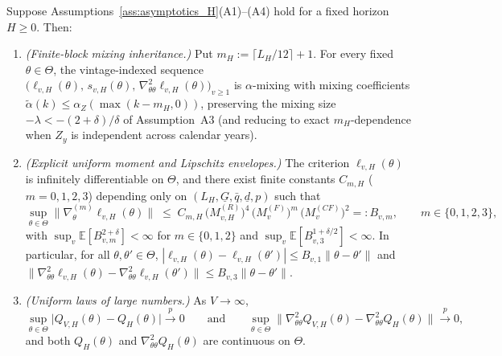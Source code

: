 \begin{lemma}
\label{lem:mixing_moment_inheritance}
Suppose Assumptions~\ref{ass:asymptotics_H}(A1)--(A4) hold for a fixed horizon $H \ge 0$. Then:
\begin{enumerate}
  \item[\textbf{(a)}] \emph{(Finite-block mixing inheritance.)} Put $m_H := \lceil L_H/12 \rceil + 1$. For every fixed $\theta \in \Theta$, the vintage-indexed sequence $\bigl(\ell_{v,H}(\theta),\, s_{v,H}(\theta),\, \nabla_{\theta\theta}^2 \ell_{v,H}(\theta)\bigr)_{v \ge 1}$ is $\alpha$-mixing with mixing coefficients $\tilde\alpha(k) \le \alpha_Z(\max(k - m_H, 0))$, preserving the mixing size $-\lambda < -(2+\delta)/\delta$ of Assumption~A3 (and reducing to exact $m_H$-dependence when $Z_y$ is independent across calendar years).
  \item[\textbf{(b)}] \emph{(Explicit uniform moment and Lipschitz envelopes.)} The criterion $\ell_{v,H}(\theta)$ is infinitely differentiable on $\Theta$, and there exist finite constants $C_{m,H}$ ($m = 0,1,2,3$) depending only on $(L_H, \underline{G}, \bar{q}, \underline{d}, p)$ such that
  \begin{equation}
  \label{eq:leibniz_envelope}
  \sup_{\theta \in \Theta} \bigl\|\nabla_\theta^{(m)} \ell_{v,H}(\theta)\bigr\|
  \;\le\; C_{m,H}\,\bigl(M_{v,H}^{(R)}\bigr)^4\,\bigl(M_v^{(F)}\bigr)^m\,\bigl(M_v^{(CF)}\bigr)^2
  =: B_{v,m}, \qquad m \in \{0,1,2,3\},
  \end{equation}
  with $\sup_v \mathbb{E}[B_{v,m}^{2+\delta}] < \infty$ for $m \in \{0,1,2\}$ and $\sup_v \mathbb{E}[B_{v,3}^{1+\delta/2}] < \infty$. In particular, for all $\theta, \theta' \in \Theta$, $|\ell_{v,H}(\theta)-\ell_{v,H}(\theta')| \le B_{v,1}\|\theta-\theta'\|$ and $\|\nabla_{\theta\theta}^2\ell_{v,H}(\theta) - \nabla_{\theta\theta}^2\ell_{v,H}(\theta')\| \le B_{v,3}\|\theta-\theta'\|$.
  \item[\textbf{(c)}] \emph{(Uniform laws of large numbers.)} As $V \to \infty$,
  \[
  \sup_{\theta \in \Theta}\bigl|Q_{V,H}(\theta) - Q_H(\theta)\bigr| \xrightarrow{p} 0
  \qquad\text{and}\qquad
  \sup_{\theta \in \Theta}\bigl\|\nabla_{\theta\theta}^2 Q_{V,H}(\theta) - \nabla_{\theta\theta}^2 Q_H(\theta)\bigr\| \xrightarrow{p} 0,
  \]
  and both $Q_H(\theta)$ and $\nabla_{\theta\theta}^2 Q_H(\theta)$ are continuous on $\Theta$.
\end{enumerate}
\end{lemma}

